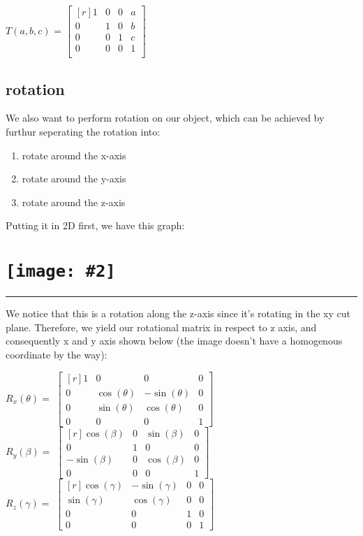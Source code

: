 \documentclass[11pt]{article}
\newcommand{\image}[2]{\texttt{[image: \#2]}}
\newcommand{\mysection}[1]{
    \section*{#1}
    \hrule
    \vspace*{0.5cm}
}
\newcommand{\mat}[1]{
    $\begin{bmatrix*}[r]
        #1
    \end{bmatrix*}$
} %
\newcommand{\gap}{\vspace*{0.5cm}}
\begin{document}
\begin{center}
    $T(a,b,c)$ = \mat{
    1 & 0 & 0 & a\\
    0 & 1 & 0 & b\\
    0 & 0 & 1 & c\\
    0 & 0 & 0 & 1 \\
}
\end{center}

\subsection{rotation}
We also want to perform rotation on our object, which can be achieved by furthur seperating the rotation into: 
\begin{enumerate}
    \item rotate around the x-axis
    \item rotate around the y-axis
    \item rotate around the z-axis
\end{enumerate}
Putting it in 2D first, we have this graph: \\
\mysection{
    \image{0.35}{rotation}{}
} 
We notice that this is a rotation along the z-axis since it's rotating in the xy cut plane. Therefore, we yield our rotational matrix in respect to z axis, and consequently x and y axis shown below (the image doesn't have a homogenous coordinate by the way): \\
\begin{center}
    $R_x(\theta) = $\mat{
        1 & 0 & 0 & 0 \\
        0 & \cos(\theta) & -\sin(\theta) & 0 \\
        0 & \sin(\theta) & \cos(\theta) & 0 \\
        0 & 0 & 0 & 1
    } \gap \\
    $R_y(\beta) = $\mat{
        \cos(\beta) & 0 & \sin(\beta) & 0 \\
        0 & 1 & 0 & 0 \\
        -\sin(\beta) & 0 & \cos(\beta) & 0 \\
        0 & 0 & 0 & 1
    } \gap \\
    $R_z(\gamma) = $\mat{
        \cos(\gamma) & -\sin(\gamma) & 0 & 0 \\
        \sin(\gamma) & \cos(\gamma) & 0 & 0 \\
        0 & 0 & 1 & 0 \\
        0 & 0 & 0 & 1
    }
\end{center}
\end{document}

